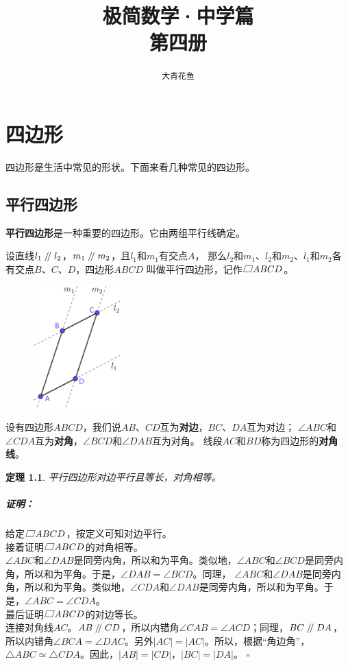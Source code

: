 \documentclass[12pt,UTF8]{ctexbook}
\title{\zihao{0} \bfseries 极简数学·中学篇 \\ 第四册}
\author{\zihao{2} \texttt{大青花鱼}}
\date{}
\newtheorem{tm}{定理}[section]
\newenvironment{proof2}{\paragraph{\textbf{证明：}}}{\hfill$\square$}
\renewcommand\parallel{\mathrel{/\mskip-4mu/}}
\newcommand\parasbx{%
    \mathord{\text{%
        \tikz[baseline] \draw (0,.1ex) -- (.8em,.1ex) -- (1em,1.6ex) -- (.2em,1.6ex) -- cycle;}}}
\begin{document}
\maketitle
\tableofcontents
\newpage

\chapter{四边形}
四边形是生活中常见的形状。下面来看几种常见的四边形。
\section{平行四边形}

\textbf{平行四边形}是一种重要的四边形。它由两组平行线确定。

设直线$l_1 \parallel l_2$，$m_1 \parallel m_2$，且$l_1$和$m_1$有交点$A$，
那么$l_2$和$m_1$、$l_2$和$m_2$、$l_1$和$m_2$各有交点$B$、$C$、$D$，四边形$ABCD$
叫做平行四边形，记作$\parasbx ABCD$。

\begin{figure} %
    \vspace{-24pt}
    \centering
    \includegraphics[width=0.3\textwidth]{平行四边形0.png}
\end{figure}

设有四边形$ABCD$，我们说$AB$、$CD$互为\textbf{对边}，$BC$、$DA$互为对边；
$\angle ABC$和$\angle CDA$互为\textbf{对角}，$\angle BCD$和$\angle DAB$互为对角。
线段$AC$和$BD$称为四边形的\textbf{对角线}。

\begin{tm}\label{tm:0-0-0}
    平行四边形对边平行且等长，对角相等。
\end{tm}
\begin{proof2}
    给定$\parasbx ABCD$，按定义可知对边平行。\\
    接着证明$\parasbx ABCD$的对角相等。\\
    $\angle ABC$和$\angle DAB$是同旁内角，所以和为平角。类似地，$\angle ABC$和$\angle BCD$是同旁内角，所以和为平角。于是，$\angle DAB = \angle BCD$。同理， $\angle ABC$和$\angle DAB$是同旁内角，所以和为平角。类似地，$\angle CDA$和$\angle DAB$是同旁内角，所以和为平角。于是，$\angle ABC = \angle CDA$。\\
    最后证明$\parasbx ABCD$的对边等长。\\
    连接对角线$AC$。$AB \parallel CD$，所以内错角$\angle CAB = \angle ACD$；同理，$BC \parallel DA$，所以内错角$\angle BCA = \angle DAC$。另外$|AC| = |AC|$。所以，根据“角边角”，$\triangle ABC \simeq \triangle CDA$。因此，$|AB| = |CD|$，$|BC| = |DA|$。    
\end{proof2}
\end{document}
